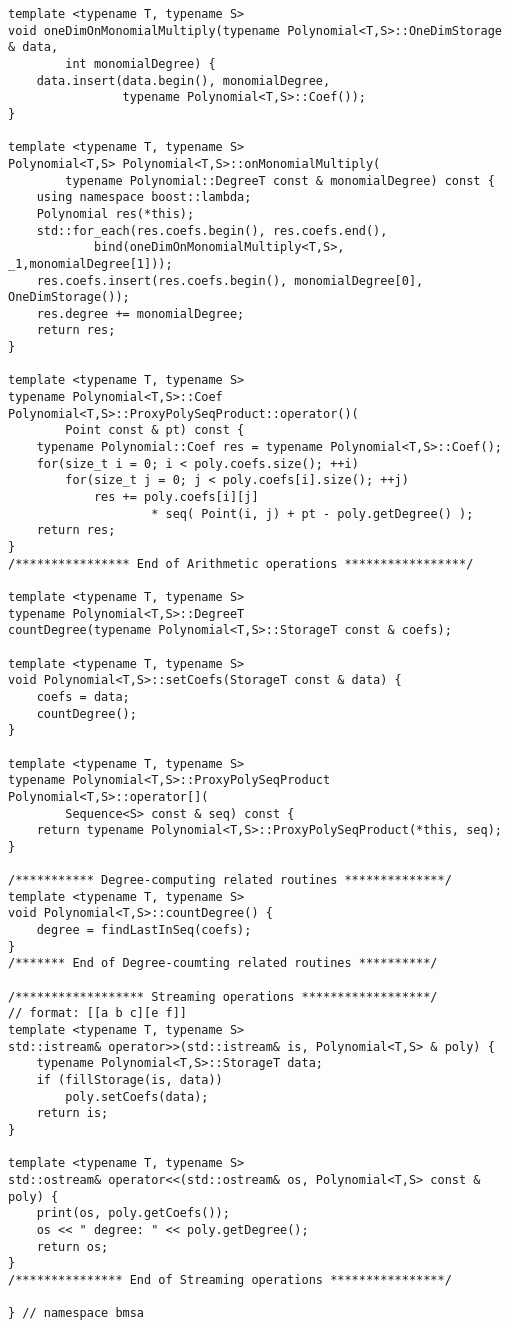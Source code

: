 \begin{lstlisting}
template <typename T, typename S>
void oneDimOnMonomialMultiply(typename Polynomial<T,S>::OneDimStorage & data,
        int monomialDegree) {
    data.insert(data.begin(), monomialDegree,
                typename Polynomial<T,S>::Coef());
}

template <typename T, typename S>
Polynomial<T,S> Polynomial<T,S>::onMonomialMultiply(
        typename Polynomial::DegreeT const & monomialDegree) const {
    using namespace boost::lambda;
    Polynomial res(*this);
    std::for_each(res.coefs.begin(), res.coefs.end(),
            bind(oneDimOnMonomialMultiply<T,S>, _1,monomialDegree[1]));
    res.coefs.insert(res.coefs.begin(), monomialDegree[0], OneDimStorage());
    res.degree += monomialDegree;
    return res;
}

template <typename T, typename S>
typename Polynomial<T,S>::Coef
Polynomial<T,S>::ProxyPolySeqProduct::operator()(
        Point const & pt) const {
    typename Polynomial::Coef res = typename Polynomial<T,S>::Coef();
    for(size_t i = 0; i < poly.coefs.size(); ++i)
        for(size_t j = 0; j < poly.coefs[i].size(); ++j)
            res += poly.coefs[i][j]
                    * seq( Point(i, j) + pt - poly.getDegree() );
    return res;
}
/**************** End of Arithmetic operations *****************/

template <typename T, typename S>
typename Polynomial<T,S>::DegreeT
countDegree(typename Polynomial<T,S>::StorageT const & coefs);

template <typename T, typename S>
void Polynomial<T,S>::setCoefs(StorageT const & data) {
    coefs = data;
    countDegree();
}

template <typename T, typename S>
typename Polynomial<T,S>::ProxyPolySeqProduct Polynomial<T,S>::operator[](
        Sequence<S> const & seq) const {
    return typename Polynomial<T,S>::ProxyPolySeqProduct(*this, seq);
}

/*********** Degree-computing related routines **************/
template <typename T, typename S>
void Polynomial<T,S>::countDegree() {
    degree = findLastInSeq(coefs);
}
/******* End of Degree-coumting related routines **********/

/****************** Streaming operations ******************/
// format: [[a b c][e f]]
template <typename T, typename S>
std::istream& operator>>(std::istream& is, Polynomial<T,S> & poly) {
    typename Polynomial<T,S>::StorageT data;
    if (fillStorage(is, data))
        poly.setCoefs(data);
    return is;
}

template <typename T, typename S>
std::ostream& operator<<(std::ostream& os, Polynomial<T,S> const & poly) {
    print(os, poly.getCoefs());
    os << " degree: " << poly.getDegree();
    return os;
}
/*************** End of Streaming operations ****************/

} // namespace bmsa

\end{lstlisting}

